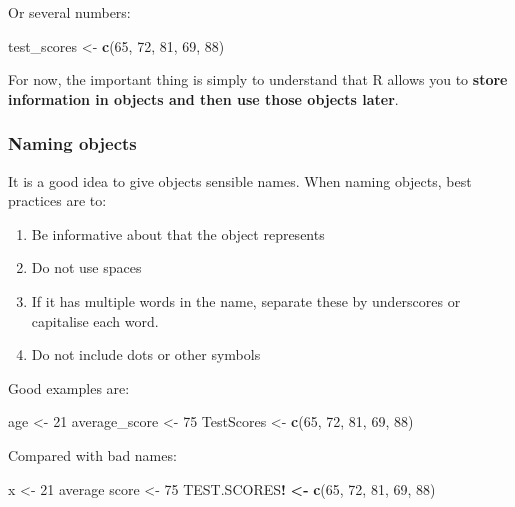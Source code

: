 \documentclass[
]{book}
\newenvironment{Shaded}{\begin{snugshade}}{\end{snugshade}}
\newcommand{\DecValTok}[1]{\textcolor[rgb]{0.00,0.00,0.81}{#1}}
\newcommand{\ErrorTok}[1]{\textcolor[rgb]{0.64,0.00,0.00}{\textbf{#1}}}
\newcommand{\FunctionTok}[1]{\textcolor[rgb]{0.13,0.29,0.53}{\textbf{#1}}}
\newcommand{\NormalTok}[1]{#1}
\newcommand{\OtherTok}[1]{\textcolor[rgb]{0.56,0.35,0.01}{#1}}
\newcommand{\SpecialCharTok}[1]{\textcolor[rgb]{0.81,0.36,0.00}{\textbf{#1}}}
\providecommand{\tightlist}{%
  \setlength{\itemsep}{0pt}\setlength{\parskip}{0pt}}
\begin{document}
Or several numbers:

\begin{Shaded}
\begin{Highlighting}[]
\NormalTok{test\_scores }\OtherTok{\textless{}{-}} \FunctionTok{c}\NormalTok{(}\DecValTok{65}\NormalTok{, }\DecValTok{72}\NormalTok{, }\DecValTok{81}\NormalTok{, }\DecValTok{69}\NormalTok{, }\DecValTok{88}\NormalTok{)}
\end{Highlighting}
\end{Shaded}

For now, the important thing is simply to understand that R allows you to \textbf{store information in objects and then use those objects later}.

\subsubsection{Naming objects}\label{naming-objects}

It is a good idea to give objects sensible names. When naming objects, best practices are to:

\begin{enumerate}
\def\labelenumi{\arabic{enumi}.}
\tightlist
\item
  Be informative about that the object represents
\item
  Do not use spaces
\item
  If it has multiple words in the name, separate these by underscores or capitalise each word.
\item
  Do not include dots or other symbols
\end{enumerate}

Good examples are:

\begin{Shaded}
\begin{Highlighting}[]
\NormalTok{age }\OtherTok{\textless{}{-}} \DecValTok{21}
\NormalTok{average\_score }\OtherTok{\textless{}{-}} \DecValTok{75}
\NormalTok{TestScores }\OtherTok{\textless{}{-}} \FunctionTok{c}\NormalTok{(}\DecValTok{65}\NormalTok{, }\DecValTok{72}\NormalTok{, }\DecValTok{81}\NormalTok{, }\DecValTok{69}\NormalTok{, }\DecValTok{88}\NormalTok{)}
\end{Highlighting}
\end{Shaded}

Compared with bad names:

\begin{Shaded}
\begin{Highlighting}[]
\NormalTok{x }\OtherTok{\textless{}{-}} \DecValTok{21}
\NormalTok{average score }\OtherTok{\textless{}{-}} \DecValTok{75}
\NormalTok{TEST.SCORES}\SpecialCharTok{!} \ErrorTok{\textless{}}\SpecialCharTok{{-}}  \FunctionTok{c}\NormalTok{(}\DecValTok{65}\NormalTok{, }\DecValTok{72}\NormalTok{, }\DecValTok{81}\NormalTok{, }\DecValTok{69}\NormalTok{, }\DecValTok{88}\NormalTok{)}
\end{Highlighting}
\end{Shaded}
\end{document}
